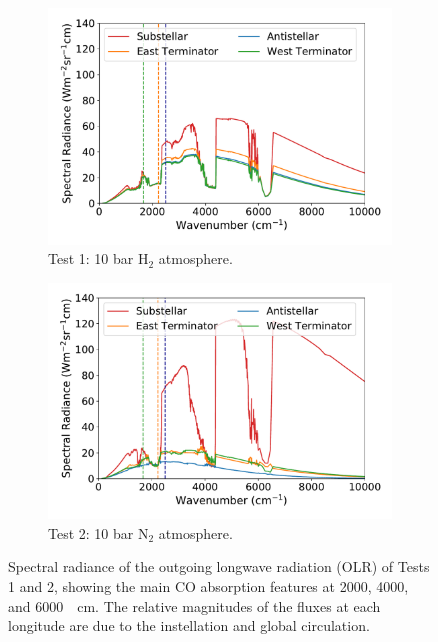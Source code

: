 


\begin{figure}
  \centering
  \begin{subfigure}[t]{0.48\textwidth}
    \includegraphics[width=\textwidth]{figures/soc-lava-planets/h2-spec-olr.pdf}
    \caption{Test 1: 10 bar H$_{2}$ atmosphere.}\label{fig:soc-spec-olr-h2}
  \end{subfigure}
\quad
  \begin{subfigure}[t]{0.48\textwidth}
    \includegraphics[width=\textwidth]{figures/soc-lava-planets/n2-spec-olr.pdf}
    \caption{Test 2: 10 bar N$_{2}$ atmosphere.}\label{fig:soc-spec-olr-n2}
  \end{subfigure}
  \caption{Spectral radiance of the outgoing longwave radiation (OLR) of Tests 1 and 2, showing the main CO absorption features at 2000, 4000, and \SI{6000}{\per\centi\metre}. The relative magnitudes of the fluxes at each longitude are due to the instellation and global circulation.}
  \label{fig:soc-spec-olr}
\end{figure}

